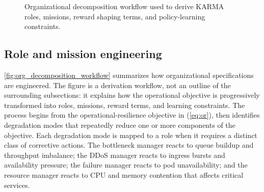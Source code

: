 \documentclass[journal]{IEEEtran}
\begin{document}
\begin{figure}[t]
  \centering
  \caption{Organizational decomposition workflow used to derive KARMA roles, missions, reward shaping terms, and policy-learning constraints.}
  \label{fig:org_decomposition_workflow}
\end{figure}

\subsection{Role and mission engineering}

\autoref{fig:org_decomposition_workflow} summarizes how organizational specifications are engineered. The figure is a derivation workflow, not an outline of the surrounding subsections: it explains how the operational objective is progressively transformed into roles, missions, reward terms, and learning constraints. The process begins from the operational-resilience objective in (\autoref{eq:or}), then identifies degradation modes that repeatedly reduce one or more components of the objective. Each degradation mode is mapped to a role when it requires a distinct class of corrective actions. The bottleneck manager reacts to queue buildup and throughput imbalance; the DDoS manager reacts to ingress bursts and availability pressure; the failure manager reacts to pod unavailability; and the resource manager reacts to CPU and memory contention that affects critical services.
\end{document}

